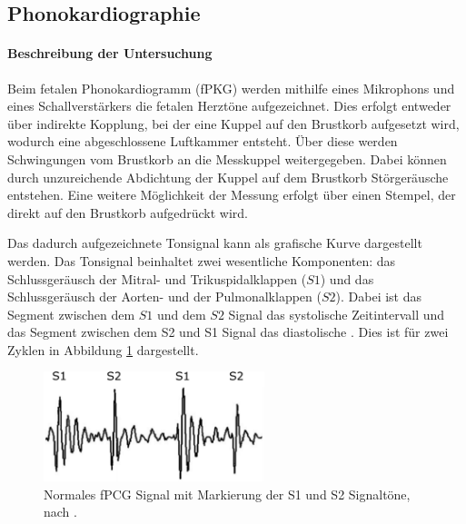 \documentclass[10pt,a4paper,headinclude,twoside, plainheadsepline, open=right, numbers=noenddot, twocolumn]{article}
\begin{document}


\subsection{Phonokardiographie}
\label{phono}

\paragraph{Beschreibung der Untersuchung}

Beim fetalen Phonokardiogramm (fPKG) werden mithilfe eines Mikrophons und eines Schallverstärkers die fetalen Herztöne aufgezeichnet.
Dies erfolgt entweder über indirekte Kopplung, bei der eine Kuppel auf den Brustkorb aufgesetzt wird, wodurch eine abgeschlossene Luftkammer entsteht.
Über diese werden Schwingungen vom Brustkorb an die Messkuppel weitergegeben.
Dabei können durch unzureichende Abdichtung der Kuppel auf dem Brustkorb Störgeräusche entstehen.
Eine weitere Möglichkeit der Messung erfolgt über einen Stempel, der direkt auf den Brustkorb aufgedrückt wird.

Das dadurch aufgezeichnete Tonsignal kann als grafische Kurve dargestellt werden.
Das Tonsignal beinhaltet zwei wesentliche Komponenten: das Schlussgeräusch der Mitral- und Trikuspidalklappen ($S1$) und das Schlussgeräusch der Aorten- und der Pulmonalklappen ($S2$).
Dabei ist das Segment zwischen dem $S1$ und dem $S2$ Signal das systolische Zeitintervall und das Segment zwischen dem S2 und S1 Signal das diastolische \cite{kovacs2011fetal}.
Dies ist für zwei Zyklen in Abbildung \ref{fig:fPCG} dargestellt.

\begin{figure}[b]
 \centering
 \includegraphics[height=3.19505cm]{./images/fPCG.eps}
\hfill
 \caption{{Normales fPCG Signal mit Markierung der S1 und S2 Signaltöne, nach \cite{kovacs2011fetal}.\label{fig:fPCG}}}
\end{figure}
\end{document}

